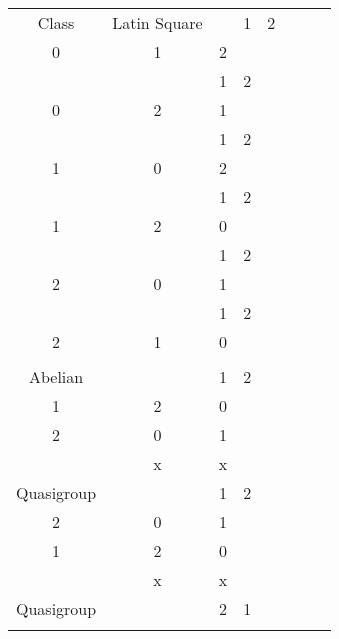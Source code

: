 \begin{longtable}{| c | c | c | c | c | c | c | c |} \hline
 Class & Latin Square& \( \begin{smallmatrix}
    0 & 1 & 2 \\
    0 & 1 & 2 \\
\end{smallmatrix} \)
& \( \begin{smallmatrix}
    0 & 1 & 2 \\
    0 & 2 & 1 \\
\end{smallmatrix} \)
& \( \begin{smallmatrix}
    0 & 1 & 2 \\
    1 & 0 & 2 \\
\end{smallmatrix} \)
& \( \begin{smallmatrix}
    0 & 1 & 2 \\
    1 & 2 & 0 \\
\end{smallmatrix} \)
& \( \begin{smallmatrix}
    0 & 1 & 2 \\
    2 & 0 & 1 \\
\end{smallmatrix} \)
& \( \begin{smallmatrix}
    0 & 1 & 2 \\
    2 & 1 & 0 \\
\end{smallmatrix} \)
 \\ \hline
\endhead
    \rowcolor{cyan} Abelian &
\( \begin{smallmatrix}
    0 & 1 & 2 \\
    1 & 2 & 0 \\
    2 & 0 & 1 \\
\end{smallmatrix} \)
 &  \cellcolor[HTML]{AA0044} x & \cellcolor[HTML]{AA0044} x &   &   &   &   \\ \hline
    Quasigroup &
\( \begin{smallmatrix}
    0 & 1 & 2 \\
    2 & 0 & 1 \\
    1 & 2 & 0 \\
\end{smallmatrix} \)
 &  \cellcolor[HTML]{AA0044} x & \cellcolor[HTML]{AA0044} x &   &   &   &   \\ \hline
    Quasigroup &
\( \begin{smallmatrix}
    0 & 2 & 1 \\

\end{smallmatrix}
\end{longtable}
